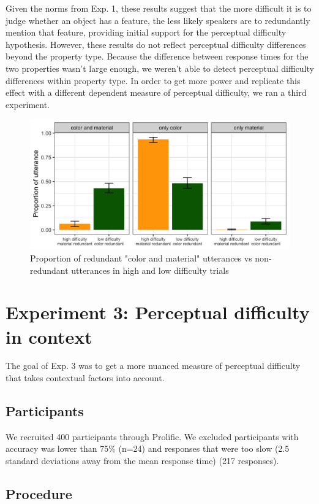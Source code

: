 \documentclass[12pt,letterpaper]{article}
\begin{document}
Given the norms from Exp. 1, these results suggest that the more difficult it is to judge whether an object has a feature, the less likely speakers are to redundantly mention that feature, providing initial support for the perceptual difficulty hypothesis. However, these results do not reflect perceptual difficulty differences beyond the property type. Because the difference between response times for the two properties wasn't large enough, we weren't able to detect perceptual difficulty differences within property type. In order to get more power and replicate this effect with a different dependent measure of perceptual difficulty, we ran a third experiment.

\begin{figure}[ht]
\centering
\includegraphics[width=.7\textwidth]{plots/exp2_proportion.png}
\caption{Proportion of redundant "color and material" utterances vs non-redundant utterances in high and low difficulty trials}
\label{fig:exp2_proportion}
\end{figure}

\section{Experiment 3: Perceptual difficulty in context} 

The goal of Exp. 3 was to get a more nuanced measure of perceptual difficulty that takes contextual factors into account.
\subsection{Participants} 

We recruited 400 participants through Prolific. We excluded participants with accuracy was lower than 75\% (n=24) and responses that were too slow (2.5 standard deviations away from the mean response time) (217 responses).

\subsection{Procedure} 
\end{document}

